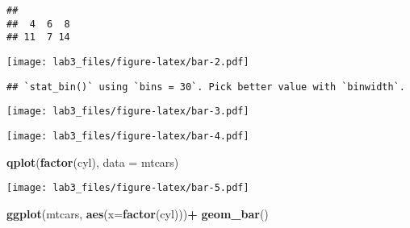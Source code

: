 \documentclass[
]{article}
\newenvironment{Shaded}{\begin{snugshade}}{\end{snugshade}}
\newcommand{\DataTypeTok}[1]{\textcolor[rgb]{0.13,0.29,0.53}{#1}}
\newcommand{\KeywordTok}[1]{\textcolor[rgb]{0.13,0.29,0.53}{\textbf{#1}}}
\newcommand{\NormalTok}[1]{#1}
\newcommand{\OperatorTok}[1]{\textcolor[rgb]{0.81,0.36,0.00}{\textbf{#1}}}
\newcommand{\StringTok}[1]{\textcolor[rgb]{0.31,0.60,0.02}{#1}}
\begin{document}
\begin{verbatim}
## 
##  4  6  8 
## 11  7 14
\end{verbatim}

\begin{Shaded}
\end{Shaded}

\texttt{[image: lab3\_files/figure-latex/bar-2.pdf]}

\begin{Shaded}
\end{Shaded}

\begin{verbatim}
## `stat_bin()` using `bins = 30`. Pick better value with `binwidth`.
\end{verbatim}

\texttt{[image: lab3\_files/figure-latex/bar-3.pdf]}

\begin{Shaded}
\end{Shaded}

\texttt{[image: lab3\_files/figure-latex/bar-4.pdf]}

\begin{Shaded}
\begin{Highlighting}[]
\KeywordTok{qplot}\NormalTok{(}\KeywordTok{factor}\NormalTok{(cyl), }\DataTypeTok{data =}\NormalTok{ mtcars)}
\end{Highlighting}
\end{Shaded}

\texttt{[image: lab3\_files/figure-latex/bar-5.pdf]}

\begin{Shaded}
\begin{Highlighting}[]
\KeywordTok{ggplot}\NormalTok{(mtcars, }\KeywordTok{aes}\NormalTok{(}\DataTypeTok{x=}\KeywordTok{factor}\NormalTok{(cyl)))}\OperatorTok{+}\StringTok{ }\KeywordTok{geom_bar}\NormalTok{()}
\end{Highlighting}
\end{Shaded}
\end{document}
